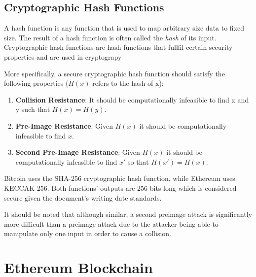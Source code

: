 
\subsection{Cryptographic Hash Functions}

A hash function is any function that is used to map arbitrary size data to fixed size. The result of a hash function is often called the \textit{hash} of its input. Cryptographic hash functions are hash functions that fullfil certain security properties and are used in cryptograpy %

More specifically, a secure cryptographic hash function should satisfy the following properties (\(H(x)\) refers to the hash of x):
\begin{enumerate}
   \item \textbf{Collision Resistance}: It should be computationally infeasible to find x and y such that \(H(x) = H(y)\). 
   \item \textbf{Pre-Image Resistance}: Given \(H(x)\) it should be computationally infeasible to find \(x\).
   \item \textbf{Second Pre-Image Resistance}: Given \(H(x)\) it should be computationally infeasible to find \(x'\) so that \(H(x') = H(x)\).
\end{enumerate}

Bitcoin uses the SHA-256 cryptographic hash function, while Ethereum uses KECCAK-256. Both functions' outputs are 256 bits long which is considered secure given the document's writing date standards.

It should be noted that although similar, a second preimage attack is significantly more difficult than a preimage attack due to the attacker being able to manipulate only one input in order to cause a collision.

\section{Ethereum Blockchain}


